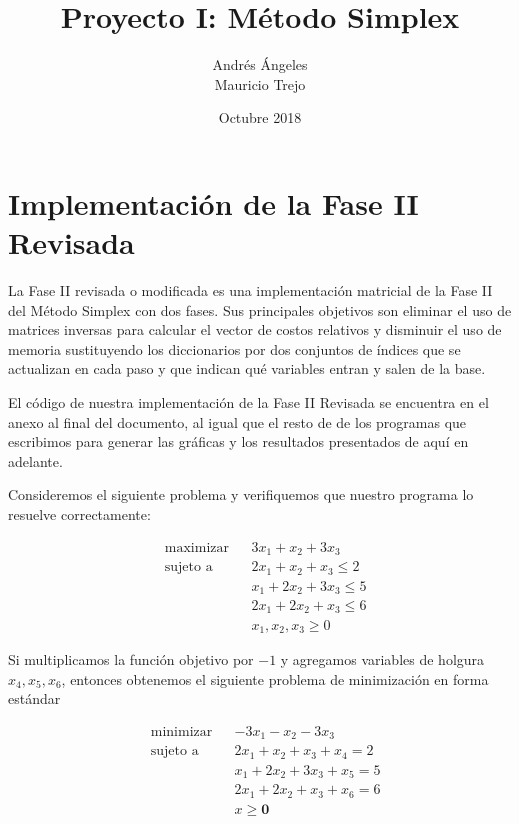 \documentclass[titlepage]{article}
\title{Proyecto I: Método Simplex}
\author{Andrés Ángeles \\ Mauricio Trejo}
\date{Octubre 2018}
\begin{document}
\maketitle


\newpage

\onehalfspacing %

\section{Implementación de la Fase II Revisada}

La Fase II revisada o modificada es una implementación matricial de la Fase II del Método Simplex con dos fases. Sus principales objetivos son eliminar el uso de matrices inversas para calcular el vector de costos relativos y disminuir el uso de memoria sustituyendo los diccionarios por dos conjuntos de índices que se actualizan en cada paso y que indican qué variables entran y salen de la base.

El código de nuestra implementación de la Fase II Revisada se encuentra en el anexo al final del documento, al igual que el resto de de los programas que escribimos para generar las gráficas y los resultados presentados de aquí en adelante.

Consideremos el siguiente problema y verifiquemos que nuestro programa lo resuelve correctamente:

\begin{equation} \label{prob-ejemplo-original}
    \begin{aligned}
        &\text{maximizar}   && 3x_1 + x_2 + 3x_3        \\
        &\text{sujeto a}    && 2x_1 + x_2 + x_3 \leq 2  \\
        &                   && x_1 + 2x_2 + 3x_3 \leq 5 \\
        &                   && 2x_1 + 2x_2 + x_3 \leq 6 \\
        &                   && x_1, x_2, x_3 \geq 0
    \end{aligned}
\end{equation}

Si multiplicamos la función objetivo por $-1$ y agregamos variables de holgura $x_4, x_5, x_6$, entonces obtenemos el siguiente problema de minimización en forma estándar

\begin{equation}
    \begin{aligned} \label{prob-ejemplo-min-forma-estandar}
        &\text{minimizar}   && -3x_1 - x_2 - 3x_3            \\
        &\text{sujeto a}    && 2x_1 + x_2 + x_3 + x_4 = 2    \\
        &                   && x_1 + 2x_2 + 3x_3 + x_5 = 5   \\
        &                   && 2x_1 + 2x_2 + x_3 + x_6 = 6   \\
        &                   && x \geq \bm{0}
    \end{aligned}
\end{equation}
\end{document}
